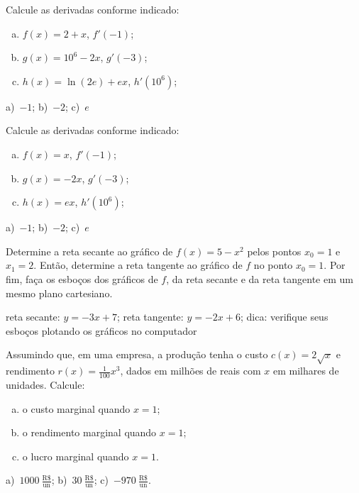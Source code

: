 \begin{exer}
  Calcule as derivadas conforme indicado:
  \begin{enumerate}[a)]
  \item $f(x) = 2 + x$, $f'(-1)$;
  \item $g(x) = 10^6 - 2x$, $g'(-3)$;
  \item $h(x) = \ln(2e) + ex$, $h'(10^6)$;
  \end{enumerate}  
\end{exer}
\begin{resp}
  a)~$-1$; b)~$-2$; c)~$e$
\end{resp}

\begin{exer}
  Calcule as derivadas conforme indicado:
  \begin{enumerate}[a)]
  \item $f(x) = x$, $f'(-1)$;
  \item $g(x) = -2x$, $g'(-3)$;
  \item $h(x) = ex$, $h'(10^6)$;
  \end{enumerate}  
\end{exer}
\begin{resp}
  a)~$-1$; b)~$-2$; c)~$e$
\end{resp}

\begin{exer}
  Determine a reta secante ao gráfico de $f(x) = 5-x^2$ pelos pontos $x_0=1$ e $x_1=2$. Então, determine a reta tangente ao gráfico de $f$ no ponto $x_0=1$. Por fim, faça os esboços dos gráficos de $f$, da reta secante e da reta tangente em um mesmo plano cartesiano.
\end{exer}
\begin{resp}
  reta secante: $y = -3x + 7$; reta tangente: $y = -2x + 6$; dica: verifique seus esboços plotando os gráficos no computador
\end{resp}

\begin{exer}
  Assumindo que, em uma empresa, a produção tenha o custo $c(x) = 2\sqrt{x}$ e rendimento $r(x) = \frac{1}{100}x^3$, dados em milhões de reais com $x$ em milhares de unidades. Calcule:
  \begin{enumerate}[a)]
  \item o custo marginal quando $x = 1$;
  \item o rendimento marginal quando $x = 1$;
  \item o lucro marginal quando $x=1$.
  \end{enumerate}
\end{exer}
\begin{resp}
  a)~$1000~\frac{\text{R}\$}{\text{un}}$; b)~$30~\frac{\text{R\$}}{\text{un}}$; c)~$-970~\frac{\text{R\$}}{\text{un}}$.
\end{resp}


